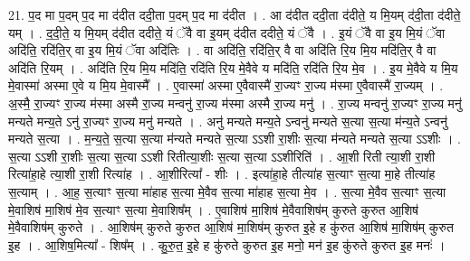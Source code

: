 \documentclass[17pt]{extarticle}
\begin{document}
21. प॒द मा प॒दम् प॒द मा द॑दीत ददी॒ता प॒दम् प॒द मा द॑दीत । . आ द॑दीत ददी॒ता द॑दीते॒ य मि॒यम् द॑दी॒ता द॑दीते॒ यम् । . द॒दी॒ते॒ य मि॒यम् द॑दीत ददीते॒ यं ॅवै वा इ॒यम् द॑दीत ददीते॒ यं ॅवै । . इ॒यं ॅवै वा इ॒य मि॒यं ॅवा अदि॑ति॒ रदि॑ति॒र् वा इ॒य मि॒यं ॅवा अदि॑तिः । . वा अदि॑ति॒ रदि॑ति॒र् वै वा अदि॑ति रि॒य मि॒य मदि॑ति॒र् वै वा अदि॑ति रि॒यम् । . अदि॑ति रि॒य मि॒य मदि॑ति॒ रदि॑ति रि॒य मे॒वैवे य मदि॑ति॒ रदि॑ति रि॒य मे॒व । . इ॒य मे॒वैवे य मि॒य मे॒वास्मा॑ अस्मा ए॒वे य मि॒य मे॒वास्मै᳚ । . ए॒वास्मा॑ अस्मा ए॒वैवास्मै॑ रा॒ज्यꣳ रा॒ज्य म॑स्मा ए॒वैवास्मै॑ रा॒ज्यम् । . अ॒स्मै॒ रा॒ज्यꣳ रा॒ज्य म॑स्मा अस्मै रा॒ज्य मन्वनु॑ रा॒ज्य म॑स्मा अस्मै रा॒ज्य मनु॑ । . रा॒ज्य मन्वनु॑ रा॒ज्यꣳ रा॒ज्य मनु॑ मन्यते मन्य॒ते ऽनु॑ रा॒ज्यꣳ रा॒ज्य मनु॑ मन्यते । . अनु॑ मन्यते मन्य॒ते ऽन्वनु॑ मन्यते स॒त्या स॒त्या म॑न्य॒ते ऽन्वनु॑ मन्यते स॒त्या । . म॒न्य॒ते॒ स॒त्या स॒त्या म॑न्यते मन्यते स॒त्या ऽऽशी रा॒शीः स॒त्या म॑न्यते मन्यते स॒त्या ऽऽशीः । . स॒त्या ऽऽशी रा॒शीः स॒त्या स॒त्या ऽऽशी रितीत्या॒शीः स॒त्या स॒त्या ऽऽशीरिति॑ । . आ॒शी रिती त्या॒शी रा॒शी रित्या॑हा॒हे त्या॒शी रा॒शी रित्या॑ह । . आ॒शीरित्या᳚ - शीः । . इत्या॑हा॒हे तीत्या॑ह स॒त्याꣳ स॒त्या मा॒हे तीत्या॑ह स॒त्याम् । . आ॒ह॒ स॒त्याꣳ स॒त्या मा॑हाह स॒त्या मे॒वैव स॒त्या मा॑हाह स॒त्या मे॒व । . स॒त्या मे॒वैव स॒त्याꣳ स॒त्या मे॒वाशिष॑ मा॒शिष॑ मे॒व स॒त्याꣳ स॒त्या मे॒वाशिष᳚म् । . ए॒वाशिष॑ मा॒शिष॑ मे॒वैवाशिष॑म् कुरुते कुरुत आ॒शिष॑ मे॒वैवाशिष॑म् कुरुते । . आ॒शिष॑म् कुरुते कुरुत आ॒शिष॑ मा॒शिष॑म् कुरुत इ॒हे ह कु॑रुत आ॒शिष॑ मा॒शिष॑म् कुरुत इ॒ह । . आ॒शिष॒मित्या᳚ - शिष᳚म् । . कु॒रु॒त॒ इ॒हे ह कु॑रुते कुरुत इ॒ह मनो॒ मन॑ इ॒ह कु॑रुते कुरुत इ॒ह मनः॑ । \newline
\end{document}
